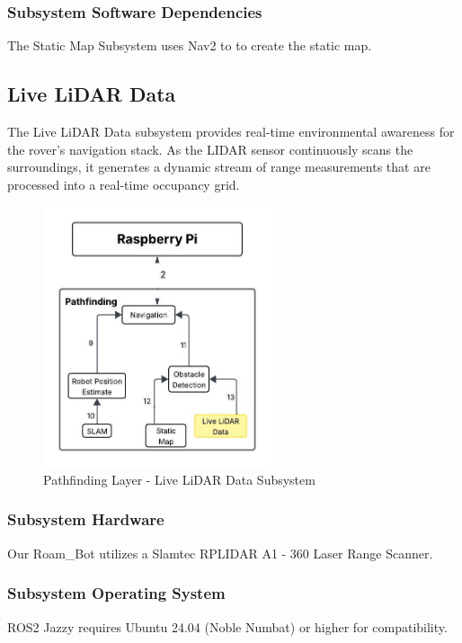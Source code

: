 \subsubsection{Subsystem Software Dependencies}
The Static Map Subsystem uses Nav2 to to create the static map.

\newpage

\subsection{Live LiDAR Data}

The Live LiDAR Data subsystem provides real-time environmental awareness for the rover's navigation stack.  As the LIDAR sensor continuously scans the surroundings, it generates a dynamic stream of range measurements that are processed into a real-time occupancy grid.


\begin{figure}[h!]
	\centering
 	\includegraphics[width=0.60\textwidth]{images/pathfinding2nd/Data_Flow_LiveLiDAR.jpeg}
 \caption{Pathfinding Layer - Live LiDAR Data Subsystem}
\end{figure}

\subsubsection{Subsystem Hardware}
Our Roam\_Bot utilizes a Slamtec RPLIDAR A1 - 360 Laser Range Scanner. 


\subsubsection{Subsystem Operating System}
ROS2 Jazzy requires Ubuntu 24.04 (Noble Numbat) or higher for compatibility.

